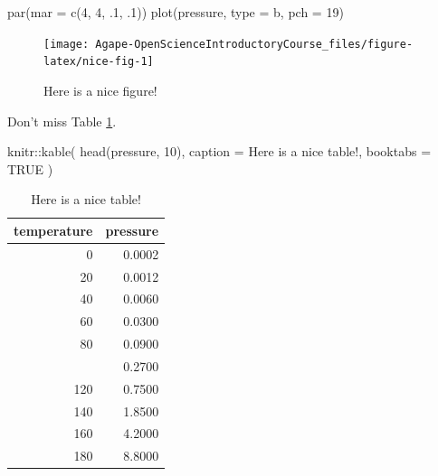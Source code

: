 \documentclass[
]{book}
\newenvironment{Shaded}{\begin{snugshade}}{\end{snugshade}}
\newcommand{\AttributeTok}[1]{\textcolor[rgb]{0.77,0.63,0.00}{#1}}
\newcommand{\ConstantTok}[1]{\textcolor[rgb]{0.00,0.00,0.00}{#1}}
\newcommand{\DecValTok}[1]{\textcolor[rgb]{0.00,0.00,0.81}{#1}}
\newcommand{\FunctionTok}[1]{\textcolor[rgb]{0.00,0.00,0.00}{#1}}
\newcommand{\NormalTok}[1]{#1}
\newcommand{\SpecialCharTok}[1]{\textcolor[rgb]{0.00,0.00,0.00}{#1}}
\newcommand{\StringTok}[1]{\textcolor[rgb]{0.31,0.60,0.02}{#1}}
\theoremstyle{definition}
\theoremstyle{definition}
\theoremstyle{definition}
\theoremstyle{definition}
\theoremstyle{remark}
\begin{document}
\begin{Shaded}
\begin{Highlighting}[]
\FunctionTok{par}\NormalTok{(}\AttributeTok{mar =} \FunctionTok{c}\NormalTok{(}\DecValTok{4}\NormalTok{, }\DecValTok{4}\NormalTok{, .}\DecValTok{1}\NormalTok{, .}\DecValTok{1}\NormalTok{))}
\FunctionTok{plot}\NormalTok{(pressure, }\AttributeTok{type =} \StringTok{\textquotesingle{}b\textquotesingle{}}\NormalTok{, }\AttributeTok{pch =} \DecValTok{19}\NormalTok{)}
\end{Highlighting}
\end{Shaded}

\begin{figure}

{\centering \texttt{[image: Agape-OpenScienceIntroductoryCourse\_files/figure-latex/nice-fig-1]} 

}

\caption{Here is a nice figure!}\label{fig:nice-fig}
\end{figure}

Don't miss Table \ref{tab:nice-tab}.

\begin{Shaded}
\begin{Highlighting}[]
\NormalTok{knitr}\SpecialCharTok{::}\FunctionTok{kable}\NormalTok{(}
  \FunctionTok{head}\NormalTok{(pressure, }\DecValTok{10}\NormalTok{), }\AttributeTok{caption =} \StringTok{\textquotesingle{}Here is a nice table!\textquotesingle{}}\NormalTok{,}
  \AttributeTok{booktabs =} \ConstantTok{TRUE}
\NormalTok{)}
\end{Highlighting}
\end{Shaded}

\begin{table}

\caption{\label{tab:nice-tab}Here is a nice table!}
\centering
\begin{tabular}[t]{rr}
\toprule
temperature & pressure\\
\midrule
0 & 0.0002\\
20 & 0.0012\\
40 & 0.0060\\
60 & 0.0300\\
80 & 0.0900\\
\addlinespace
100 & 0.2700\\
120 & 0.7500\\
140 & 1.8500\\
160 & 4.2000\\
180 & 8.8000\\
\bottomrule
\end{tabular}
\end{table}
\end{document}
